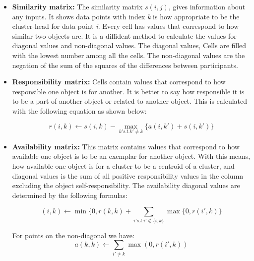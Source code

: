 \documentclass[../UNBThesis2.tex]{subfiles}
\begin{document}
\begin{itemize}

  \item\textbf{Similarity matrix:}
  The similarity matrix $s(i,j)$, gives information about any inputs. It shows data points with index \textit{k} is how appropriate to be the cluster-head for data point \textit{i}. Every cell has values that correspond to how similar two objects are. It is a diffident method to calculate the values for diagonal values and non-diagonal values.  The diagonal values,  Cells are filled with the lowest number among all the cells. The non-diagonal values are the negation of the sum of the squares of the differences between participants.
  \item\textbf{Responsibility matrix:} Cells contain values that correspond to how responsible one object is for another. It is better to say how responsible it is to be a part of another object or related to another object. This is calculated with the following equation as shown below:

    \begin{equation}
        r(i, k) \leftarrow s(i, k) - \max\limits_{k' s.t. k' \neq k}\{ a(i, k') + s(i, k') \}
    \end{equation}
    
    
  \item\textbf{Availability matrix:} This matrix contains values that correspond to how available one object is to be an exemplar for another object. With this means, how available one object is for a cluster to be a centroid of a cluster, and diagonal values is the sum of all positive responsibility values in the column excluding the object self-responsibility. 
  The availability diagonal values are determined by the following formulas:

    \begin{equation}
        (i, k) \leftarrow \min\{0, r(k,k) + \sum\limits_{i' s.t. i' \notin \{i, k\}}{\max\{0, r(i', k)\}}
    \end{equation} 
    
    For points on the non-diagonal we have:
    \begin{equation}
        a(k, k) \leftarrow \sum\limits_{i' \neq k}\max(0, r(i', k))
    \end{equation}




\end{itemize}
\end{document}
